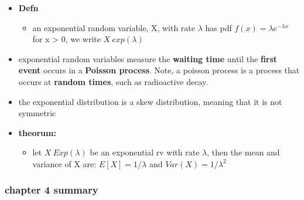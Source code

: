 \documentclass[
]{article}
\providecommand{\tightlist}{%
  \setlength{\itemsep}{0pt}\setlength{\parskip}{0pt}}
\begin{document}
\begin{itemize}
\tightlist
\item
  \textbf{Defn}

  \begin{itemize}
  \tightlist
  \item
    an exponential random variable, X, with rate \(\lambda\) has pdf
    \(f(x) = \lambda e^{-\lambda x}\) for x \textgreater{} 0, we write
    \(X ~ exp(\lambda)\)
  \end{itemize}
\item
  exponential random variables measure the \textbf{waiting time} until
  the \textbf{first event} occurs in a \textbf{Poisson process}. Note, a
  poisson process is a process that occurs at \textbf{random times},
  such as radioactive decay.
\item
  the exponential distribution is a skew distribution, meaning that it
  is not symmetric
\item
  \textbf{theorum:}

  \begin{itemize}
  \tightlist
  \item
    let \(X ~ Exp(\lambda)\) be an exponential rv with rate \(\lambda\),
    then the mean and variance of X are: \(E[X] = 1 / \lambda\) and
    \(Var(X) = 1 / \lambda^2\)
  \end{itemize}
\end{itemize}

\hypertarget{chapter-4-summary}{%
\subsubsection{chapter 4 summary}\label{chapter-4-summary}}
\end{document}
